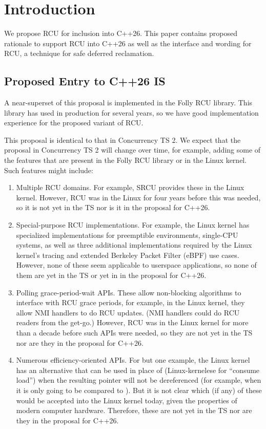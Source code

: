 
\chapter{Introduction}
\label{chp:Introduction}

We propose RCU for inclusion into C++26.
This paper contains proposed rationale to support RCU into C++26 as
well as the interface and wording for RCU, a technique for safe deferred
reclamation.

\section{Proposed Entry to C++26 IS}
\label{sec:Proposed Entry to C++26 IS}

A near-superset of this proposal is implemented in the Folly RCU library.
This library has used in production for several years, so we have good
implementation experience for the proposed variant of RCU.

This proposal is identical to that in Concurrency TS 2.
We expect that the proposal in Concurrency TS 2 will change over
time, for example, adding some of the features that are present in
the Folly RCU library or in the Linux kernel.
Such features might include:

\begin{enumerate}
\item	Multiple RCU domains.
	For example, SRCU provides these in the Linux kernel.
	However, RCU was in the Linux for four years before
	this was needed, so it is not yet in the TS nor is it
	in the proposal for C++26.
\item	Special-purpose RCU implementations.
	For example, the Linux kernel has specialized implementations
	for preemptible environments, single-CPU systems,
	as well as three additional implementations required by
	the Linux kernel's tracing and extended Berkeley Packet
	Filter (eBPF) use cases.
	However, none of these seem applicable to userspace applications,
	so none of them are yet in the TS or yet in in the proposal
	for C++26.
\item	Polling grace-period-wait APIs.
	These allow non-blocking algorithms to interface with RCU
	grace periods, for example, in the Linux kernel, they allow
	NMI handlers to do RCU updates.
	(NMI handlers could do RCU readers from the get-go.)
	However, RCU was in the Linux kernel for more than a decade
	before such APIs were needed, so they are not yet in the
	TS nor are they in the proposal for C++26.
\item	Numerous efficiency-oriented APIs.
	For but one example, the Linux kernel has an alternative
	 that can be used in place
	of  (Linux-kernelese for ``consume load'')
	when the resulting pointer will not be dereferenced
	(for example, when it is only going to be compared to ).
	But it is not clear which (if any) of these would be accepted
	into the Linux kernel today, given the properties of modern
	computer hardware.
	Therefore, these are not yet in the TS nor are they in the
	proposal for C++26.
\end{enumerate}

